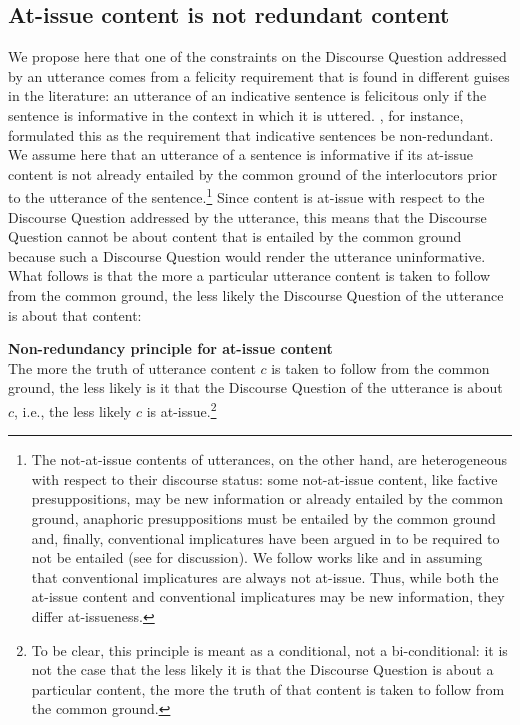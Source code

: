\documentclass[11pt,fleqn]{article}
\newcommand{\6}{\mbox{$[\hspace*{-.6mm}[$}}
\newcommand{\9}{\mbox{$]\hspace*{-.6mm}]$}}
\begin{document}
\subsection{At-issue content is not redundant content}\label{s23}

We propose here that one of the constraints on the Discourse Question addressed by an utterance comes from a felicity requirement that is found in different guises in the literature: an utterance of an indicative sentence is felicitous only if the sentence is informative in the context in which it is uttered. \citet[144]{groenendijk1999}, for instance, formulated this as the requirement that indicative sentences be non-redundant. We assume here that an utterance of a sentence is informative if its at-issue content is not already entailed by the common ground of the interlocutors prior to the utterance of the sentence.\footnote{The not-at-issue contents of utterances, on the other hand, are heterogeneous with respect to their discourse status: some not-at-issue content, like factive presuppositions, may be new information or already entailed by the common ground, anaphoric presuppositions must be entailed by the common ground and, finally, conventional implicatures have been argued in \citealt{potts05} to be required to not be entailed (see \citealt{brst-lang11} for discussion). We follow works like \citealt{potts05} and \citealt{murray2014} in assuming that conventional implicatures are always not at-issue. Thus, while both the at-issue content and conventional implicatures may be new information, they differ at-issueness.} Since content is at-issue with respect to the Discourse Question addressed by the utterance, this means that the Discourse Question cannot be about content that is entailed by the common ground because such a Discourse Question would render the utterance uninformative. What follows is that the more a particular utterance content is taken to follow from the common ground, the less likely the Discourse Question of the utterance is about that content:

\begin{exe}

\ex\label{principle} {\bf Non-redundancy principle for at-issue content} \\ The more the truth of utterance content $c$ is taken to follow from the common ground, the less likely is it that the Discourse Question of the utterance is about $c$, i.e., the less likely $c$ is at-issue.\footnote{To be clear, this principle is meant as a conditional, not a bi-conditional: it is not the case that the less likely it is that the Discourse Question is about a particular content, the more the truth of that content is taken to follow from the common ground.}

\end{exe}
\end{document}

